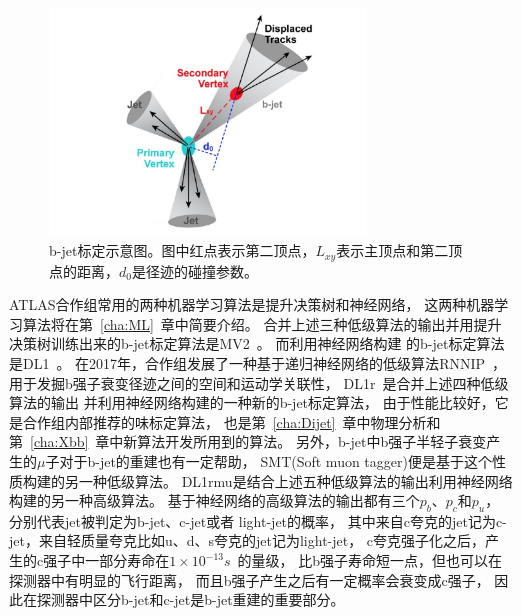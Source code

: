 \begin{figure}
  \begin{center}
    \includegraphics[width=0.75\textwidth]{figuresEXP/ATLASBJET2.jpg}
  \end{center}
  \caption{
b-jet标定示意图。图中红点表示第二顶点，$L_{xy}$表示主顶点和第二顶点的距离，$d_0$是径迹的碰撞参数。
  }
    \label{fig:ATLASBJET1}
\end{figure}


ATLAS合作组常用的两种机器学习算法是提升决策树和神经网络，
这两种机器学习算法将在第~\ref{cha:ML}~章中简要介绍。
合并上述三种低级算法的输出并用提升决策树训练出来的b-jet标定算法是MV2~\cite{IPTD}。
而利用神经网络构建
的b-jet标定算法是DL1~\cite{IPTD}。
在2017年，合作组发展了一种基于递归神经网络的低级算法\textsc{RNNIP}~\cite{RNNIP}，用于发掘b强子衰变径迹之间的空间和运动学关联性，
DL1r~\cite{DLOR1,DLOR2}是合并上述四种低级算法的输出
并利用神经网络构建的一种新的b-jet标定算法，
由于性能比较好，它是合作组内部推荐的味标定算法，
也是第~\ref{cha:Dijet}~章中物理分析和第~\ref{cha:Xbb}~章中新算法开发所用到的算法。
另外，b-jet中b强子半轻子衰变产生的$\mu$子对于b-jet的重建也有一定帮助，
SMT(Soft muon tagger)便是基于这个性质构建的另一种低级算法。
DL1rmu是结合上述五种低级算法的输出利用神经网络构建的另一种高级算法。
基于神经网络的高级算法的输出都有三个$p_b$、$p_c$和$p_u$，分别代表jet被判定为b-jet、c-jet或者
light-jet的概率，
其中来自c夸克的jet记为c-jet，来自轻质量夸克比如u、d、s夸克的jet记为light-jet，
c夸克强子化之后，产生的c强子中一部分寿命在$1\times10^{-13}s$~\cite{PDG}的量级，
比b强子寿命短一点，但也可以在探测器中有明显的飞行距离，
而且b强子产生之后有一定概率会衰变成c强子，
因此在探测器中区分b-jet和c-jet是b-jet重建的重要部分。

